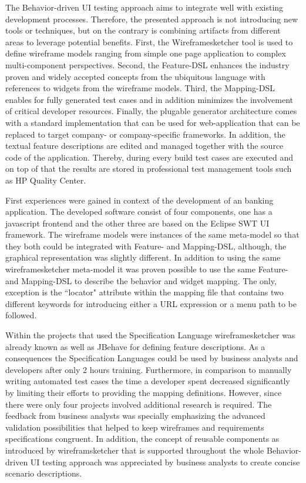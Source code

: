 \documentclass{sig-alternate-05-2015}
\begin{document}
The Behavior-driven UI testing approach aims to integrate well with existing development processes. 
Therefore, the presented approach is not introducing new tools or techniques, but on the contrary is combining artifacts from different areas to leverage potential benefits.
First, the Wireframesketcher tool is used to define wireframe models ranging from simple one page application to complex multi-component perspectives.
Second, the Feature-DSL enhances the industry proven and widely accepted concepts from the ubiquitous language with references to widgets from the wireframe models.
Third, the Mapping-DSL enables for fully generated test cases and in addition minimizes the involvement of critical developer resources. 
Finally, the plugable generator architecture comes with a standard implementation that can be used for web-application that can be replaced to target company- or company-specific frameworks.
In addition, the textual feature descriptions are edited and managed together with the source code of the application.
Thereby, during every build test cases are executed and on top of that the results are stored in professional test management tools such as HP Quality Center.


First experiences were gained in context of the development of an banking application. 
The developed software consist of four components, one has a javascript frontend and the other three are based on the Eclipse SWT UI framework.
The wireframe models were instances of the same meta-model so that they both could be integrated with Feature- and Mapping-DSL, although, the graphical representation was slightly different.
In addition to using the same wireframesketcher meta-model it was proven possible to use the same Feature- and Mapping-DSL to describe the behavior and widget mapping.
The only, exception is the ``locator" attribute within the mapping file that contains two different keywords for introducing either a URL expression or a menu path to be followed.

Within the projects that used the Specification Language wireframesketcher was already known as well as JBehave for defining feature descriptions.
As a consequences the Specification Languages could be used by business analysts and developers after only 2 hours training.
Furthermore, in comparison to manually writing automated test cases the time a developer spent decreased significantly by limiting their efforts to providing the mapping definitions.
However, since there were only four projects involved additional research is required.
The feedback from business analysts was specially emphasizing the advanced validation possibilities that helped to keep wireframes and requirements specifications congruent.
In addition, the concept of reusable components as introduced by wireframsketcher that is supported throughout the whole Behavior-driven UI testing approach was appreciated by business analysts to create concise scenario descriptions.
 
\end{document}
